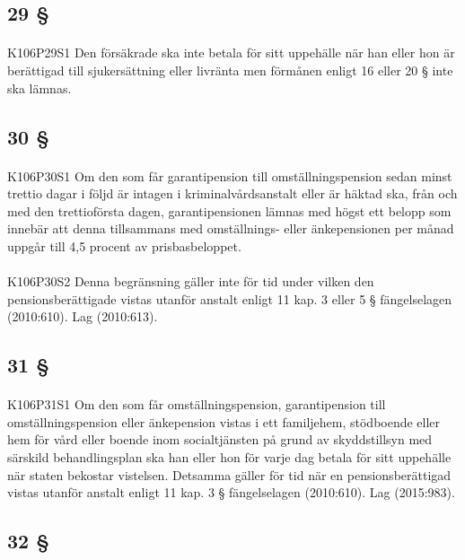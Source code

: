 \documentclass[a4paper,notitlepage,openany,10pt]{book}
\begin{document}
\subsection*{29 §}
\paragraph*{}
{\tiny K106P29S1}
Den försäkrade ska inte betala för sitt uppehälle när han eller hon är berättigad till sjukersättning eller livränta men förmånen enligt 16 eller 20 § inte ska lämnas.
\subsection*{30 §}
\paragraph*{}
{\tiny K106P30S1}
Om den som får garantipension till omställningspension sedan minst trettio dagar i följd är intagen i kriminalvårdsanstalt eller är häktad ska, från och med den trettioförsta dagen, garantipensionen lämnas med högst ett belopp som innebär att denna tillsammans med omställnings- eller änkepensionen per månad uppgår till 4,5 procent av prisbasbeloppet.
\paragraph*{}
{\tiny K106P30S2}
Denna begränsning gäller inte för tid under vilken den pensionsberättigade vistas utanför anstalt enligt 11 kap. 3 eller 5 § fängelselagen (2010:610).
Lag (2010:613).
\subsection*{31 §}
\paragraph*{}
{\tiny K106P31S1}
Om den som får omställningspension, garantipension till omställningspension eller änkepension vistas i ett familjehem, stödboende eller hem för vård eller boende inom socialtjänsten på grund av skyddstillsyn med särskild behandlingsplan ska han eller hon för varje dag betala för sitt uppehälle när staten bekostar vistelsen. Detsamma gäller för tid när en pensionsberättigad vistas utanför anstalt enligt 11 kap. 3 § fängelselagen (2010:610).
Lag (2015:983).
\subsection*{32 §}
\end{document}

